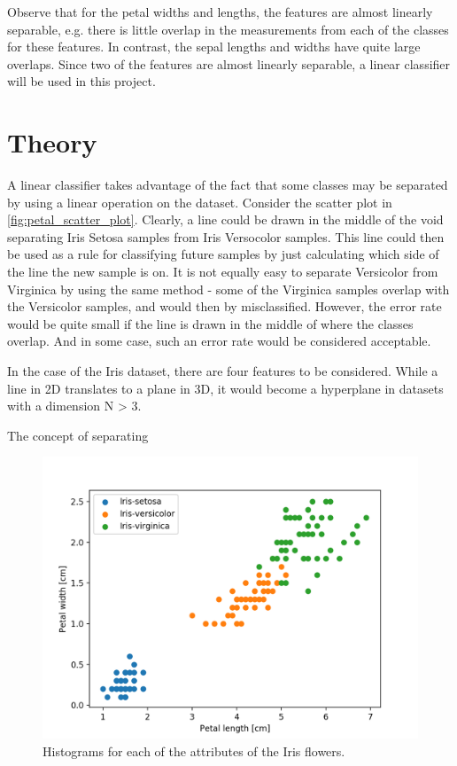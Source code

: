 \documentclass{article}
\begin{document}
Observe that for the petal widths and lengths, the features are almost linearly separable, e.g.
there is little overlap in the measurements from each of the classes for these features. In contrast,
the sepal lengths and widths have quite large overlaps. Since two of the features are almost
linearly separable, a linear classifier will be used in this project.

\section{Theory}

A linear classifier takes advantage of the fact that some classes may be separated by using a
linear operation on the dataset. Consider the scatter plot in \autoref{fig:petal_scatter_plot}.
Clearly, a line could be drawn in the middle of the void separating Iris Setosa samples from
Iris Versocolor samples. This line could then be used as a rule for classifying future samples
by just calculating which side of the line the new sample is on. It is not equally easy to
separate Versicolor from Virginica by using the same method - some of the Virginica samples overlap
with the Versicolor samples, and would then by misclassified. However, the error rate would be
quite small if the line is drawn in the middle of where the classes overlap. And in some case,
such an error rate would be considered acceptable.

In the case of the Iris dataset, there are four features to be considered. While a line in 2D
translates to a plane in 3D, it would become a hyperplane in datasets with a dimension N > 3.


The concept of separating

\begin{figure}
    \centering
    \includegraphics[width=\textwidth]{../images/petal_scatter.png}
    \caption{Histograms for each of the attributes of the Iris flowers.}
    \label{fig:petal_scatter_plot}
\end{figure}
\end{document}
